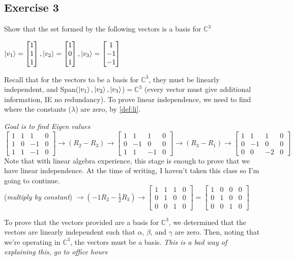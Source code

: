 \documentclass[12pt]{article}
\theoremstyle{plain}
\theoremstyle{nonumberplain}
\theoremstyle{plain}
\theoremstyle{nonumberplain}
\newcommand\1{{\bf 1}}
\newcommand{\bmat}[1]{\begin{bmatrix*} #1 \end{bmatrix*}} %
\newcommand{\C}{\mathbb{C}} %
\newcommand{\<}{\left\langle}
\renewcommand{\>}{\right\rangle}
\begin{document}
\subsection{Exercise 3}
Show that the set formed by the following vectors is a basis for $\C^3$
\begin{center}
$\ket{v_1}=\bmat{1 \\ 1 \\ 1}, \ket{v_2}=\bmat{1 \\ 0 \\ 1}, \ket{v_3}=\bmat{1 \\ -1 \\ -1}$
\end{center}
Recall that for the vectors to be a basis for $\C^3$, they must be linearly independent, and
Span($\ket{v_1},\ket{v_2},\ket{v_3}$)$=\C^3$ (every vector must give additional information, IE no redundancy). To prove linear independence, we need to find where the constants ($\lambda$) are zero, by \ref{def:li}. \\
\begin{center}
\textit{Goal is to find Eigen values }
$\bmat{1 & 1 & 1 & 0 \\ 1 & 0 & -1 & 0 \\ 1 & 1 & -1 & 0}\longrightarrow (R_2-R_3)\longrightarrow\bmat{1 & 1 & 1 & 0 \\ 0 & -1 & 0 & 0 \\ 1 & 1 & -1 & 0}\longrightarrow (R_3-R_1)\longrightarrow\bmat{1 & 1 & 1 & 0 \\ 0 & -1 & 0 & 0 \\ 0 & 0 & -2 & 0}$ \\
Note that with linear algebra experience, this stage is enough to prove that we have linear independence. At the time of writing, I haven't taken this class so I'm going to continue. \\
(\textit{multiply by constant})
$\longrightarrow (-1R_2-\frac{1}{2}R_3)\longrightarrow\bmat{1 & 1 & 1 & 0 \\ 0 & 1 & 0 & 0 \\ 0 & 0 & 1 & 0}=\bmat{1 & 0 & 0 & 0 \\ 0 & 1 & 0 & 0 \\ 0 & 0 & 1 & 0}$
\end{center}
To prove that the vectors provided are a basis for $\C^3$, we determined that the vectors are linearly independent such that $\alpha$, $\beta$, and $\gamma$ are zero. Then, noting that we're operating in $\C^3$, the vectors must be a basis. \textit{This is a bad way of explaining this, go to office hours}
\end{document}
